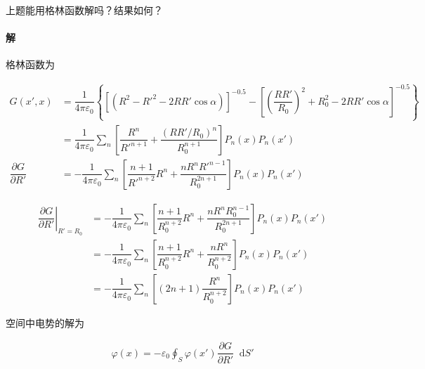 \documentclass{article}
\newcommand*{\md}{\mathop{}\!\mathrm{d}}
\begin{document}
上题能用格林函数解吗？结果如何？

\paragraph{解}

格林函数为

\begin{equation*}
  \begin{aligned}
    G \left( x', x \right) &= 
      \dfrac{1}{4\pi \varepsilon_0} \left\{ \left[ \left( R^2 - R'^2 - 2 R R' \cos \alpha \right) \right]^{-0.5} -
      \left[ \left( \dfrac{R R'}{R_0}  \right)^2 + R_0^2 - 2 RR' \cos \alpha \right]^{-0.5}
    \right\} \\
    &= \dfrac{1}{4\pi \varepsilon_0} \sum_n \left[ \dfrac{R^n}{R'^{n+1}} + \dfrac{\left( RR'/R_0 \right)^n}{R_0^{n+1}}   \right] P_n \left( x \right) P_n \left( x' \right) \\
    \dfrac{\partial G}{\partial R'} &=
    - \dfrac{1}{4\pi \varepsilon_0} \sum_n \left[ \dfrac{n+1}{R'^{n+2}} R^n + \dfrac{nR^n R'^{n-1}}{R_0^{2n+1}} \right] P_n \left( x \right) P_n \left( x' \right)
  \end{aligned}
\end{equation*}

\begin{equation*}
  \begin{aligned}
    \left. \dfrac{\partial G}{\partial R'} \right|_{R'=R_0} &=
    - \dfrac{1}{4\pi \varepsilon_0} \sum_n \left[ \dfrac{n+1}{R_0^{n+2}} R^n + \dfrac{nR^n R_0^{n-1}}{R_0^{2n+1}} \right] P_n \left( x \right) P_n \left( x' \right) \\
    &= - \dfrac{1}{4\pi \varepsilon_0} \sum_n \left[ \dfrac{n+1}{R_0^{n+2}} R^n + \dfrac{nR^n }{R_0^{n+2}} \right] P_n \left( x \right) P_n \left( x' \right) \\
    &= - \dfrac{1}{4\pi \varepsilon_0} \sum_n \left[ \left( 2n+1 \right) \dfrac{R^n }{R_0^{n+2}} \right] P_n \left( x \right) P_n \left( x' \right)
  \end{aligned}
\end{equation*}

空间中电势的解为

\begin{equation*}
  \begin{aligned}
    \varphi \left( x \right) = - \varepsilon_0 \oint_S \varphi \left( x' \right) \dfrac{\partial G}{\partial R'}  \md S'
  \end{aligned}
\end{equation*}
\end{document}
